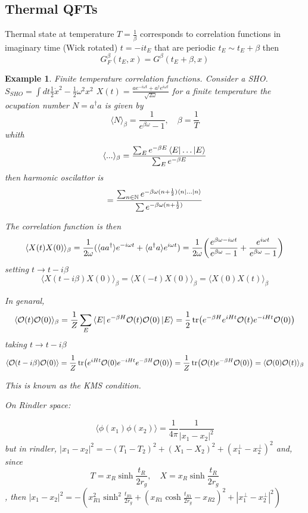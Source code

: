 \documentclass[10pt,
 article,
 amsmath,amssymb
]{revtex4-2}
\newtheorem{example}[theorem]{Example}
\begin{document}
\subsection{Thermal QFTs}
Thermal state at temperature $T=\frac{1}{\beta}$ corresponds to correlation functions in imaginary time (Wick rotated) 
$t=-it_E$ that are periodic $t_E\sim t_E+\beta$ then $$G_F^\beta(t_E,x)= G^\beta (t_E+\beta,x)$$
\begin{example}
    Finite temperature correlation functions. Consider a SHO. $S_{SHO}=\int dt \frac{1}{2}\dot{x}^2 -\frac{1}{2} \omega^2 x^2$
    $X(t)=\frac{a e^{-i\omega t}+a^\dagger e^{i\omega t}}{\sqrt{2\omega}}$ for a finite temperature the ocupation number $N= a^\dagger a$ is given by 
    $$\langle N \rangle_\beta =\frac{1}{e^{\beta \omega}-1}, \quad \beta=\frac{1}{T}$$
    whith $$\langle ... \rangle_\beta= \frac{\sum_E e^{-\beta E} \bra{E}\dots \ket{E}}{\sum_E e^{-\beta E}}$$ then harmonic oscilattor is 
    $$=\frac{\sum_{n\in \mathbb{N}} e^{-\beta \omega(n+\frac{1}{2})\bra{n} ... \ket{n}}}{\sum e^{-\beta \omega(n+\frac{1}{2}) }}$$

 The correlation function is then 
 \begin{equation}
    \langle X(t) X(0) \rangle_\beta= \frac{1}{2\omega} (\langle a a^\dagger\rangle e^{-i\omega t}+ \langle a^\dagger a \rangle e^{i\omega t})= \frac{1}{2\omega} \qty(\frac{e^{\beta \omega -i\omega t}}{e^{\beta \omega}-1} +\frac{e^{i\omega t}}{e^{\beta \omega}-1})
 \end{equation}
 setting $t\to t-i\beta$ 
 \begin{equation}
    \langle X(t-i\beta) X(0) \rangle_\beta= \langle X(-t) X(0) \rangle_\beta = \langle X(0) X(t) \rangle_\beta
 \end{equation}

 In genaral, $$\langle \mathcal{O}(t)\mathcal{O}(0)\rangle_\beta = \frac{1}{Z} \sum_E \bra{E} e^{-\beta H} \mathcal{O}(t) \mathcal{O}(0) \ket{E}= \frac{1}{2} \tr(e^{-\beta H} e^{iHt} \mathcal{O}(t) e^{-iHt}\mathcal{O}(0))  $$
 taking $t\to t-i \beta$ 
 $$\langle \mathcal{O}(t-i\beta) \mathcal{O}(0)\rangle =\frac{1}{Z} \tr(e^{iHt} \mathcal{O}(0) e^{-iHt} e^{-\beta H}\mathcal{O}(0))=\frac{1}{Z} \tr( \mathcal{O}(t) e^{-\beta H}\mathcal{O}(0)) = \langle \mathcal{O}(0) \mathcal{O}(t) \rangle_\beta$$
 
 This is known as the KMS condition.
 
 On Rindler space:
 
 $$\langle \phi(x_1) \phi(x_2)\rangle=\frac{1}{4\pi} \frac{1}{|x_1-x_2|^2}$$ but in rindler,
 $|x_1-x_2|^2=-(T_1-T_2)^2+(X_1-X_2)^2+(x_1^\perp -x_2^\perp)^2$ and, since $$T=x_R \sinh \frac{t_R}{2r_g}, \quad X=x_R \sinh \frac{t_R}{2r_g}$$, then $|x_1-x_2|^2=-(x_{R1}^2 \sinh^2 \frac{t_{R1}}{2r_g}+(x_{R1}\cosh \frac{ t_{R1}}{2r_g}-x_{R2})^2 +|x_1^\perp-x_2^\perp|^2)$
 

\end{example}
\end{document}
